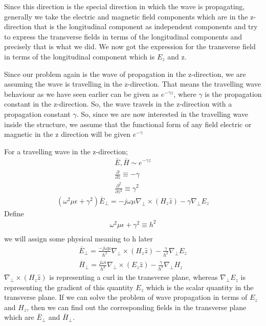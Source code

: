 Since this direction is the special direction in which the wave is propagating, generally we take the electric and magnetic field components which are in the z-direction that is the longitudinal component as independent components and try to express the transverse fields in terms of the longitudinal components and precisely that is what we did. We now got the expression for the transverse field in terms of the longitudinal component which is $E_z$ and z.

Since our problem again is the wave of propagation in the z-direction, we are assuming the wave is travelling in the z-direction. That means the travelling wave behaviour as we have seen earlier can be given as $e^{-\gamma z}$, where $\gamma$ is the propagation constant in the z-direction. So, the wave travels in the z-direction with a propagation constant $\gamma$. So, since we are now interested in the travelling wave inside the structure, we assume that the functional form of any field electric or magnetic in the z direction will be given $e^{-\gamma}$

For a travelling wave in the z-direction;
\begin{align*}
\bar{E}, \bar{H} \sim e^{-\gamma z}\\
\frac{\partial}{\partial z} \equiv -\gamma\\
\frac{\partial^2}{\partial z^2} \equiv \gamma^2
\end{align*}
\begin{align*}
(\omega^2\mu\epsilon + \gamma^2)\bar{E}_\bot = -j\omega\mu\nabla_\bot\times(H_z\hat{z})-\gamma\nabla_\bot E_z
\end{align*}
Define
\begin{align*}
\omega^2\mu\epsilon + \gamma^2 \equiv h^2\\
\end{align*}
we will assign some physical meaning to h later
\begin{align*}
\bar{E}_\bot = \frac{-j\omega\mu}{h^2}\nabla_\bot\times(H_z\hat{z}) - \frac{\gamma}{h^2}\nabla_\bot E_z\\
\bar{H}_\bot = \frac{j\omega\epsilon}{h^2}\nabla_\bot\times(E_z\hat{z}) - \frac{\gamma}{h^2}\nabla_\bot H_z
\end{align*}
$\nabla_\bot\times(H_z\hat{z})$ is representing a curl in the transverse plane, whereas $\nabla_\bot E_z$ is representing the gradient of this quantity $E_z$ which is the scalar quantity in the transverse plane. If we can solve the problem of wave propagation in terms of $E_z$ and $H_z$, then we can find out the corresponding fields in the transverse plane which are $\bar{E}_\bot$ and $\bar{H}_\bot$.

